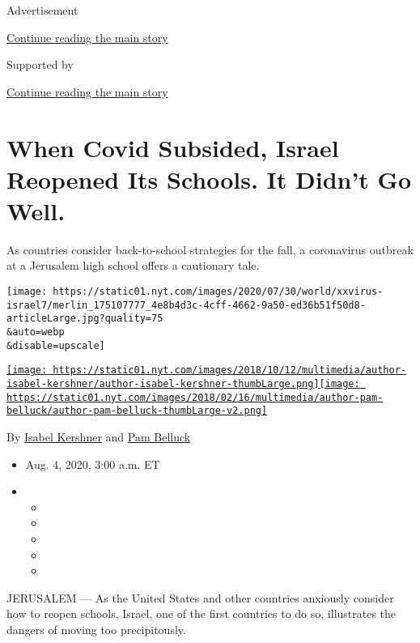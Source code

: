 Advertisement

\protect\hyperlink{after-top}{Continue reading the main story}

Supported by

\protect\hyperlink{after-sponsor}{Continue reading the main story}

\hypertarget{when-covid-subsided-israel-reopened-its-schools-it-didnt-go-well}{%
\section{When Covid Subsided, Israel Reopened Its Schools. It Didn't Go
Well.}\label{when-covid-subsided-israel-reopened-its-schools-it-didnt-go-well}}

As countries consider back-to-school strategies for the fall, a
coronavirus outbreak at a Jerusalem high school offers a cautionary
tale.

\texttt{[image: https://static01.nyt.com/images/2020/07/30/world/xxvirus-israel7/merlin\_175107777\_4e8b4d3c-4cff-4662-9a50-ed36b51f50d8-articleLarge.jpg?quality=75\\\&auto=webp\\\&disable=upscale]}

\href{https://www.nytimes.com/by/isabel-kershner}{\texttt{[image: https://static01.nyt.com/images/2018/10/12/multimedia/author-isabel-kershner/author-isabel-kershner-thumbLarge.png]}}\href{https://www.nytimes.com/by/pam-belluck}{\texttt{[image: https://static01.nyt.com/images/2018/02/16/multimedia/author-pam-belluck/author-pam-belluck-thumbLarge-v2.png]}}

By \href{https://www.nytimes.com/by/isabel-kershner}{Isabel Kershner}
and \href{https://www.nytimes.com/by/pam-belluck}{Pam Belluck}

\begin{itemize}
\item
  Aug. 4, 2020, 3:00 a.m. ET
\item
  \begin{itemize}
  \item
  \item
  \item
  \item
  \item
  \end{itemize}
\end{itemize}

JERUSALEM --- As the United States and other countries anxiously
consider how to reopen schools, Israel, one of the first countries to do
so, illustrates the dangers of moving too precipitously.

